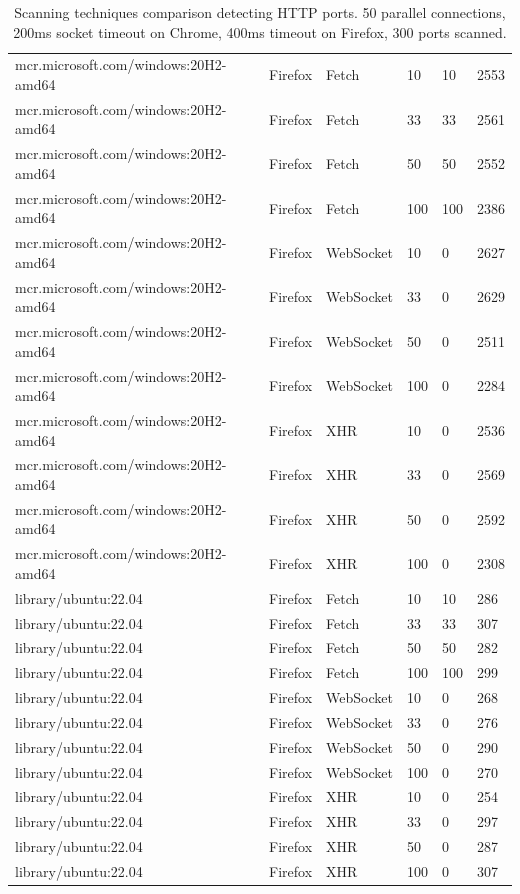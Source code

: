 \begin{table}[htbp]
\begin{adjustwidth}{-1.0cm}{}
\begin{tabular}{p{6.3cm}p{1.5cm}p{1.7cm}p{1cm}p{1.3cm}p{3cm}}
    \midrule
    mcr.microsoft.com/windows:20H2-amd64 & Firefox & Fetch & 10 & 10 & 2553 \\
    mcr.microsoft.com/windows:20H2-amd64 & Firefox & Fetch & 33 & 33 & 2561 \\
    mcr.microsoft.com/windows:20H2-amd64 & Firefox & Fetch & 50 & 50 & 2552 \\
    mcr.microsoft.com/windows:20H2-amd64 & Firefox & Fetch & 100 & 100 & 2386 \\
    \midrule
    mcr.microsoft.com/windows:20H2-amd64 & Firefox & WebSocket & 10 & 0 & 2627 \\
    mcr.microsoft.com/windows:20H2-amd64 & Firefox & WebSocket & 33 & 0 & 2629 \\
    mcr.microsoft.com/windows:20H2-amd64 & Firefox & WebSocket & 50 & 0 & 2511 \\
    mcr.microsoft.com/windows:20H2-amd64 & Firefox & WebSocket & 100 & 0 & 2284 \\
    \midrule
    mcr.microsoft.com/windows:20H2-amd64 & Firefox & XHR & 10 & 0 & 2536 \\
    mcr.microsoft.com/windows:20H2-amd64 & Firefox & XHR & 33 & 0 & 2569 \\
    mcr.microsoft.com/windows:20H2-amd64 & Firefox & XHR & 50 & 0 & 2592 \\
    mcr.microsoft.com/windows:20H2-amd64 & Firefox & XHR & 100 & 0 & 2308 \\
    \midrule
    library/ubuntu:22.04 & Firefox & Fetch & 10 & 10 & 286 \\
    library/ubuntu:22.04 & Firefox & Fetch & 33 & 33 & 307 \\
    library/ubuntu:22.04 & Firefox & Fetch & 50 & 50 & 282 \\
    library/ubuntu:22.04 & Firefox & Fetch & 100 & 100 & 299 \\
    \midrule
    library/ubuntu:22.04 & Firefox & WebSocket & 10 & 0 & 268 \\
    library/ubuntu:22.04 & Firefox & WebSocket & 33 & 0 & 276 \\
    library/ubuntu:22.04 & Firefox & WebSocket & 50 & 0 & 290 \\
    library/ubuntu:22.04 & Firefox & WebSocket & 100 & 0 & 270 \\
    \midrule
    library/ubuntu:22.04 & Firefox & XHR & 10 & 0 & 254 \\
    library/ubuntu:22.04 & Firefox & XHR & 33 & 0 & 297 \\
    library/ubuntu:22.04 & Firefox & XHR & 50 & 0 & 287 \\
    library/ubuntu:22.04 & Firefox & XHR & 100 & 0 & 307 \\
     \bottomrule
\end{tabular}
\end{adjustwidth}{}
\caption{Scanning techniques comparison detecting HTTP ports. 50 parallel connections, 200ms socket timeout on Chrome, 400ms timeout on Firefox, 300 ports scanned.}

\label{tab:scan-technique-comparison}
\end{table}

